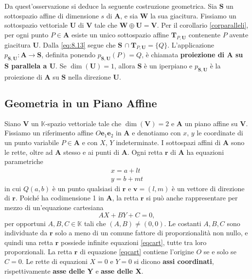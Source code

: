 \documentclass{article}
\theoremstyle{plain}
\theoremstyle{definition}
\theoremstyle{remark}
\begin{document}
\vspace{10pt}

Da quest'osservazione si deduce la seguente costruzione geometrica. Sia $\mathbf{S}$ un sottospazio affine di dimensione $s$ di $\mathbf{A}$, e sia $\mathbf{W}$ la sua giacitura. 
Fissiamo un sottospazio vettoriale $\mathbf{U}$ di $\mathbf{V}$ tale che $\mathbf{W}\oplus \mathbf{U}=\mathbf{V}$. 
Per il corollario \ref{corparalleli}, per ogni punto $P\in \mathbf{A}$ esiste un unico sottospazio affine $\mathbf{T}_{P,\mathbf{U}}$ contenente $P$ avente giacitura $\mathbf{U}$. 
Dalla \eqref{eq:8.13} segue che $\mathbf{S}\,\cap \mathbf{T}_{P,\mathbf{U}}=\{Q\}$. 
L'applicazione $p_{\mathbf{S},\mathbf{U}}:\mathbf{A}\to \mathbf{S}$, definita ponendo $p_{\mathbf{S},\mathbf{U}}(P)=Q$, è chiamata \textbf{proiezione di $\mathbf{A}$ su $\mathbf{S}$ parallela a $\mathbf{U}$}. 
Se $\dim(\mathbf{U})=1$, allora $\mathbf{S}$ è un iperpiano e $p_{\mathbf{S},\mathbf{U}}$ è la proiezione di $\mathbf{A}$ su $\mathbf{S}$ nella direzione $\mathbf{U}$. 

\vspace{50pt}
\subsection{Geometria in un Piano Affine}
\vspace{20pt}

Siano $\mathbf{V}$ un $\mathbb{K}$-spazio vettoriale tale che $\dim(\mathbf{V}) = 2$ e $\mathbf{A}$ un piano affine su $\mathbf{V}$. 
Fissiamo un riferimento affine $O\mathbf{e}_1\mathbf{e}_2$ in $\mathbf{A}$ e denotiamo con $x$, $y$ le coordinate di un punto variabile $P \in \mathbf{A}$ e con $X$, $Y$ indeterminate. 
I sottospazi affini di $\mathbf{A}$ sono le rette, oltre ad $\mathbf{A}$ stesso e ai punti di $\mathbf{A}$.
Ogni retta $\mathbf{r}$ di $\mathbf{A}$ ha equazioni parametriche
\begin{equation}\label{eqparam}
    \begin{matrix}
        x = a + lt \\
        y = b + mt
    \end{matrix} 
\end{equation}
in cui $Q(a, b)$ è un punto qualsiasi di $\mathbf{r}$ e $\mathbf{v} = (l, m)$ è un vettore di direzione di $\mathbf{r}$. 
Poiché ha codimensione 1 in $\mathbf{A}$, la retta $\mathbf{r}$ si può anche rappresentare per mezzo di un'equazione cartesiana
\begin{equation}\label{eqcart}
AX + BY + C = 0,
\end{equation}
per opportuni $A, B, C \in \mathbb{K}$ tali che $(A, B) \neq (0, 0)$. Le costanti $A, B, C$ sono individuate da $\mathbf{r}$ solo a meno di un comune fattore di proporzionalità non nullo, 
e quindi una retta $\mathbf{r}$ possiede infinite equazioni \ref{eqcart}, tutte tra loro proporzionali. 
La retta $\mathbf{r}$ di equazione \ref{eqcart} contiene l'origine $O$ se e solo se $C = 0$. 
Le rette di equazioni $X = 0$ e $Y = 0$ si dicono \textbf{assi coordinati}, rispettivamente \textbf{asse delle Y} e \textbf{asse delle X}.
\end{document}
